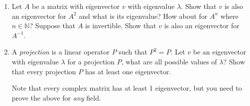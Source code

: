 \begin{enumerate}
\begin{enumerate}
\end{enumerate}


\item Let $A$ be a matrix with eigenvector $v$ with eigenvalue $\lambda$. Show that $v$ is also an eigenvector for $A^2$ and what is its eigenvalue? How about for $A^n$ where $n \in \mathbb{N}$? Suppose that $A$ is invertible. Show that $v$ is also an eigenvector for $A^{-1}$.

\item A \emph{projection} is a linear operator $P$ such that $P^2 = P$. Let $v$ be an eigenvector with eigenvalue $\lambda$ for a projection $P$, what are all possible values of $\lambda$? Show that every projection $P$ has at least one eigenvector.

Note that every complex matrix has at least 1 eigenvector, but you need to prove the above for \emph{any} field.

\end{enumerate}

